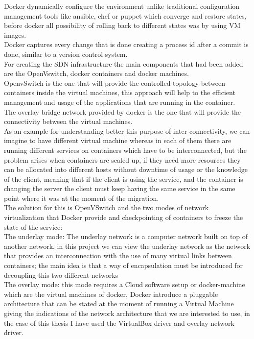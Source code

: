 Docker dynamically configure the environment unlike traditional configuration management tools like ansible, chef or puppet which converge and restore states, before docker all possibility of rolling back to different states was by using VM images.\\ 

Docker captures every change that is done creating a process id after a commit is done, similar to a version control system.\cite{2}\\
   
For creating the SDN infrastructure the main components that had been added are the OpenVswitch, docker containers and docker machines.\\ 

OpenvSwitch is the one that will provide the controlled topology between containers inside the virtual machines, this approach will help to the efficient management and usage of the applications that are running in the container.\\ 

The overlay bridge network provided by docker is the one that will provide the connectivity between the virtual machines.\\

As an example for understanding better this purpose of inter-connectivity, we can imagine to have different virtual machine whereas in each of them there are running different services on containers which have to be interconnected, but the problem arises when containers are scaled up, if they need more resources they can be allocated into different hosts without downtime of usage or the knowledge of the client, meaning that if the client is using the service, and the container is changing the server the client must keep having the same service in the same point where it was at the moment of the migration. \\

The solution for this is OpenVSwitch and the two modes of network virtualization that Docker provide and checkpointing of containers to freeze the state of the service: \\

The underlay mode: The underlay network is a computer network built on top of another network, in this project we can view the underlay network as the network that provides an interconnection with the use of many virtual links between containers; the main idea is that a way of encapsulation must be introduced for decoupling this two different networks \\

The overlay mode: this mode requires a Cloud software setup or docker-machine which are the virtual machines of docker, Docker introduce a pluggable architecture that can be stated at the moment of running a Virtual Machine giving the indications of the network architecture that we are interested to use, in the case of this thesis I have used the VirtualBox driver and overlay network driver. \\
